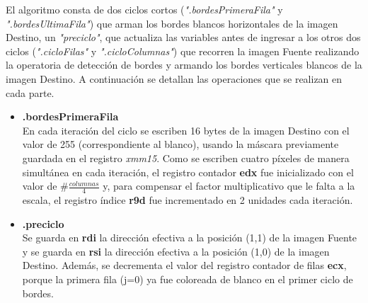 \documentclass[a4paper]{article}
\begin{document}
\justify
El algoritmo consta de dos ciclos cortos (\textit{".bordesPrimeraFila"} y \textit{".bordesUltimaFila"}) que arman los bordes blancos horizontales de la imagen Destino, un \textit{"preciclo"}, que actualiza las variables antes de ingresar a los otros dos ciclos (\textit{".cicloFilas"} y \textit{".cicloColumnas"}) que recorren la imagen Fuente realizando la operatoria de detección de bordes y armando los bordes verticales blancos de la imagen Destino. A continuación se detallan las operaciones que se realizan en cada parte.

\begin{itemize}
	\item \textbf{.bordesPrimeraFila}\\
	 En cada iteración del ciclo se escriben 16 bytes de la imagen Destino con el valor de 255 (correspondiente al blanco), usando la máscara previamente guardada en el registro \textit{xmm15}. Como se escriben cuatro píxeles de manera simultánea en cada iteración, el registro contador \textbf{edx} fue inicializado con el valor de $\#\frac{columnas}{4}$ y, para compensar el factor multiplicativo que le falta a la escala, el registro índice \textbf{r9d} fue incrementado en 2 unidades cada iteración.  
	
	\item \textbf{.preciclo}\\
	Se guarda en \textbf{rdi} la dirección efectiva a la posición (1,1) de la imagen Fuente y se guarda en \textbf{rsi} la dirección efectiva a la posición (1,0) de la imagen Destino. Además, se decrementa el valor del registro contador de filas \textbf{ecx}, porque la primera fila (j=0) ya fue coloreada de blanco en el primer ciclo de bordes.  
	

\end{itemize}
\end{document}
